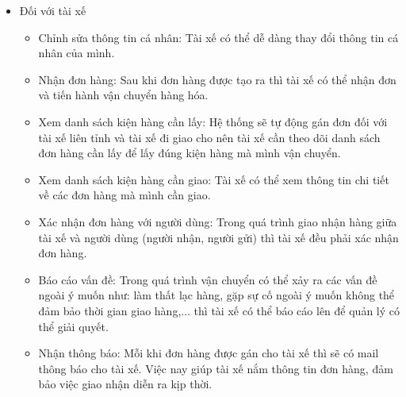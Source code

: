 \begin{itemize}
\begin{itemize}
				    \end{itemize}
				
			         
				\item Đối với tài xế
	                \begin{itemize}
	                    \item Chỉnh sửa thông tin cá nhân: Tài xế có thể dễ dàng thay đổi thông tin cá nhân của mình.
	                    \item Nhận đơn hàng: Sau khi đơn hàng được tạo ra thì tài xế có thể nhận đơn và tiến hành vận chuyển hàng hóa.
	                    \item Xem danh sách kiện hàng cần lấy: Hệ thống sẽ tự động gán đơn đối với tài xế liên tỉnh và tài xế đi giao cho nên tài xế cần theo dõi danh sách đơn hàng cần lấy để lấy đúng kiện hàng mà mình vận chuyển.
	                    \item Xem danh sách kiện hàng cần giao: Tài xế có thể xem thông tin chi tiết về các đơn hàng mà mình cần giao.
	                    \item Xác nhận đơn hàng với người dùng: Trong quá trình giao nhận hàng giữa tài xế và người dùng (người nhận, người gửi) thì tài xế đều phải xác nhận đơn hàng.
	                    \item Báo cáo vấn đề: Trong quá trình vận chuyển có thể xảy ra các vấn đề ngoài ý muốn như: làm thất lạc hàng, gặp sự cố ngoài ý muốn không thể đảm bảo thời gian giao hàng,... thì tài xế có thể báo cáo lên để quản lý có thể giải quyết.
	                    \item Nhận thông báo: Mỗi khi đơn hàng được gán cho tài xế thì sẽ có mail thông báo cho tài xế. Việc nay giúp tài xế nắm thông tin đơn hàng, đảm bảo việc giao nhận diễn ra kịp thời.
	                \end{itemize}
	                

\end{itemize}
